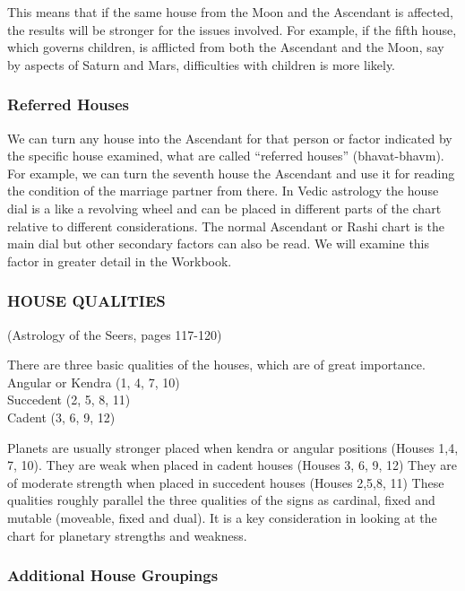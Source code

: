  

This means that if the same house from the Moon and the Ascendant is affected, the results will be stronger for the issues involved. For example, if the fifth house, which governs children, is afflicted from both the Ascendant and the Moon, say by aspects of Saturn and Mars, difficulties with children is more likely.

 

\subsubsection{Referred Houses}

 

We can turn any house into the Ascendant for that person or factor indicated by the specific house examined, what are called “referred houses” (bhavat-bhavm). For example, we can turn the seventh house the Ascendant and use it for reading the condition of the marriage partner from there. In Vedic astrology the house dial is a like a revolving wheel and can be placed in different parts of the chart relative to different considerations. The normal Ascendant or Rashi chart is the main dial but other secondary factors can also be read. We will examine this factor in greater detail in the Workbook.

 

\subsubsection{HOUSE QUALITIES} (Astrology of the Seers, pages 117-120)

 

There are three basic qualities of the houses, which are of great importance.\\
Angular or Kendra (1, 4, 7, 10)\\
Succedent  (2, 5, 8, 11)\\
Cadent (3, 6, 9, 12) 
 

Planets are usually stronger placed when kendra or angular positions (Houses 1,4, 7, 10). They are weak when placed in cadent houses (Houses 3, 6, 9, 12) They are of moderate strength when placed in  succedent houses (Houses 2,5,8, 11) These qualities roughly parallel the three qualities of the signs as cardinal, fixed and mutable (moveable, fixed and dual). It is a key consideration in looking at the chart for planetary strengths and weakness.

 

\subsubsection{Additional House Groupings}

